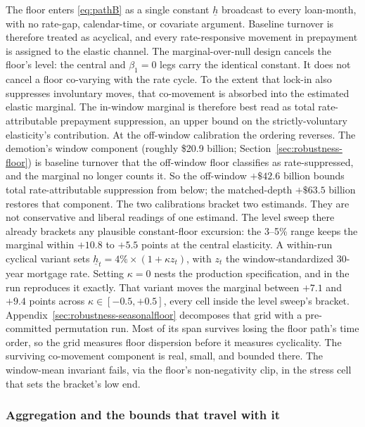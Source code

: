 \documentclass[12pt]{article}
\begin{document}
The floor enters \eqref{eq:pathB} as a single constant $\underline{h}$ broadcast to every loan-month, with no rate-gap, calendar-time, or covariate argument. Baseline turnover is therefore treated as acyclical, and every rate-responsive movement in prepayment is assigned to the elastic channel. The marginal-over-null design cancels the floor's level: the central and $\beta_1 = 0$ legs carry the identical constant. It does not cancel a floor co-varying with the rate cycle. To the extent that lock-in also suppresses involuntary moves, that co-movement is absorbed into the estimated elastic marginal. The in-window marginal is therefore best read as total rate-attributable prepayment suppression, an upper bound on the strictly-voluntary elasticity's contribution. At the off-window calibration the ordering reverses. The demotion's window component (roughly \$20.9 billion; Section~\ref{sec:robustness-floor}) is baseline turnover that the off-window floor classifies as rate-suppressed, and the marginal no longer counts it. So the off-window $+\$42.6$ billion bounds total rate-attributable suppression from below; the matched-depth $+\$63.5$ billion restores that component. The two calibrations bracket two estimands. They are not conservative and liberal readings of one estimand. The level sweep there already brackets any plausible constant-floor excursion: the 3--5\% range keeps the marginal within $+10.8$ to $+5.5$ points at the central elasticity. A within-run cyclical variant sets $\underline{h}_t = 4\% \times (1 + \kappa z_t)$, with $z_t$ the window-standardized 30-year mortgage rate. Setting $\kappa = 0$ nests the production specification, and in the run reproduces it exactly. That variant moves the marginal between $+7.1$ and $+9.4$ points across $\kappa \in [-0.5, +0.5]$, every cell inside the level sweep's bracket. Appendix~\ref{sec:robustness-seasonalfloor} decomposes that grid with a pre-committed permutation run. Most of its span survives losing the floor path's time order, so the grid measures floor dispersion before it measures cyclicality. The surviving co-movement component is real, small, and bounded there. The window-mean invariant fails, via the floor's non-negativity clip, in the stress cell that sets the bracket's low end.

\subsubsection{Aggregation and the bounds that travel with it}
\end{document}
